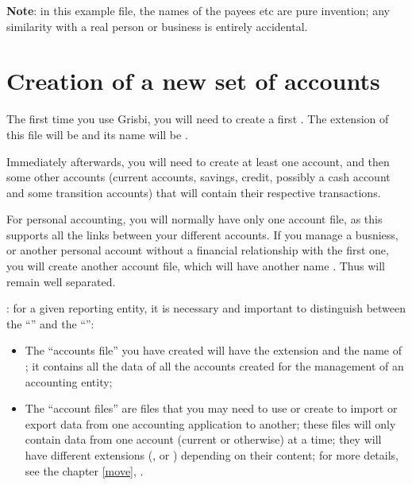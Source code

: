 \textbf{Note}: in this example file, the names of the payees etc are pure invention; any similarity with a real person or business is entirely accidental.

\section{Creation of a new set of accounts\label{start-newfile}}


The first time you use Grisbi, you will need to create a first
. The \gls{extension} of this file will be  and its name will be .


Immediately afterwards, you will need to create at least one account, and then some other accounts (current accounts, savings, credit, possibly a cash account and some transition accounts) that will contain their respective transactions.

For personal accounting, you will normally have only one account file, as this supports all the links between your different accounts. If you manage a busniess, or another personal account without a financial relationship with the first one, you will create another account file, which will have another name . Thus  will remain well separated.



: for a given reporting entity, it is necessary and important to distinguish between the  \enquote{} and the  \enquote{}:
\begin{itemize}

\item The \enquote{accounts file} you have created will have the extension  and the name of ; it contains all the data of all the accounts created for the management of an accounting entity;

\item The \enquote{account files} are files that you may need to use or create to import or export data from one accounting application to another; these files will only contain data from one account (current or otherwise) at a time; they will have different extensions (,  or ) depending on their content; for more details, see the chapter \vref{move}, .
\end{itemize}

